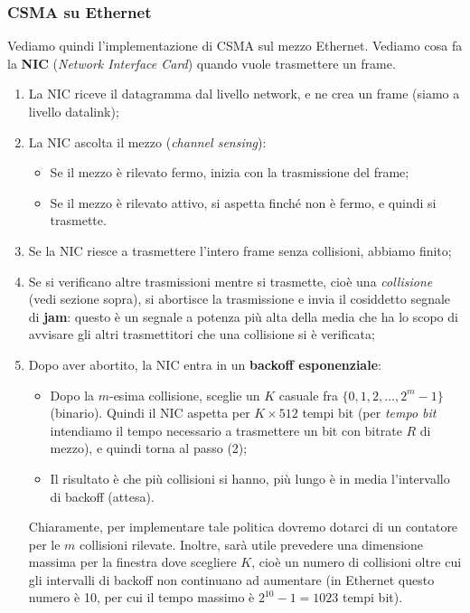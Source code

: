 \documentclass[a4paper,11pt]{article}
\begin{document}
\subsubsection{CSMA su Ethernet}
Vediamo quindi l'implementazione di CSMA sul mezzo Ethernet.
Vediamo cosa fa la \textbf{NIC} (\textit{Network Interface Card}) quando vuole trasmettere un frame.
\begin{enumerate}
	\item La NIC riceve il datagramma dal livello network, e ne crea un frame (siamo a livello datalink);
	\item La NIC ascolta il mezzo (\textit{channel sensing}):
		\begin{itemize}
			\item Se il mezzo è rilevato fermo, inizia con la trasmissione del frame;
			\item Se il mezzo è rilevato attivo, si aspetta finché non è fermo, e quindi si trasmette.
		\end{itemize}
	\item Se la NIC riesce a trasmettere l'intero frame senza collisioni, abbiamo finito;
	\item Se si verificano altre trasmissioni mentre si trasmette, cioè una \textit{collisione} (vedi sezione sopra), si abortisce la trasmissione e invia il cosiddetto segnale di \textbf{jam}: questo è un segnale a potenza più alta della media che ha lo scopo di avvisare gli altri trasmettitori che una collisione si è verificata;
	\item Dopo aver abortito, la NIC entra in un \textbf{backoff esponenziale}:
		\begin{itemize}
			\item Dopo la $m$-esima collisione, sceglie un $K$ casuale fra $\{ 0, 1, 2, ..., 2^m - 1 \}$ (binario). Quindi il NIC aspetta per $K \times 512$ tempi bit (per \textit{tempo bit} intendiamo il tempo necessario a trasmettere un bit con bitrate $R$ di mezzo), e quindi torna al passo (2);
			\item Il risultato è che più collisioni si hanno, più lungo è in media l'intervallo di backoff (attesa). 
		\end{itemize}
	Chiaramente, per implementare tale politica dovremo dotarci di un contatore per le $m$ collisioni rilevate. Inoltre, sarà utile prevedere una dimensione massima per la finestra dove scegliere $K$, cioè un numero di collisioni oltre cui gli intervalli di backoff non continuano ad aumentare (in Ethernet questo numero è 10, per cui il tempo massimo è $2^10 -1 = 1023$ tempi bit).
\end{enumerate}
\end{document}
